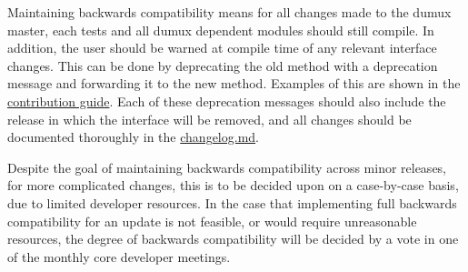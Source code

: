 Maintaining backwards compatibility means for all changes made to the dumux master, each tests and all dumux dependent modules should still compile. In addition, the user should be warned at compile time of any relevant interface changes. This can be done by deprecating the old method with a deprecation message and forwarding it to the new method. Examples of this are shown in the \href{https://git.iws.uni-stuttgart.de/dumux-repositories/dumux/blob/master/CONTRIBUTING.md}{contribution guide}. Each of these deprecation messages should also include the release in which the interface will be removed, and all changes should be documented thoroughly in the \href{https://git.iws.uni-stuttgart.de/dumux-repositories/dumux/-/blob/master/CHANGELOG.md}{changelog.md}.

Despite the goal of maintaining backwards compatibility across minor releases,
for more complicated changes, this is to be decided upon on a case-by-case basis, due to limited developer resources.
In the case that implementing full backwards compatibility for an update is not feasible, or would require unreasonable resources, the degree of backwards compatibility will be decided by a vote in one of the monthly core developer meetings.
